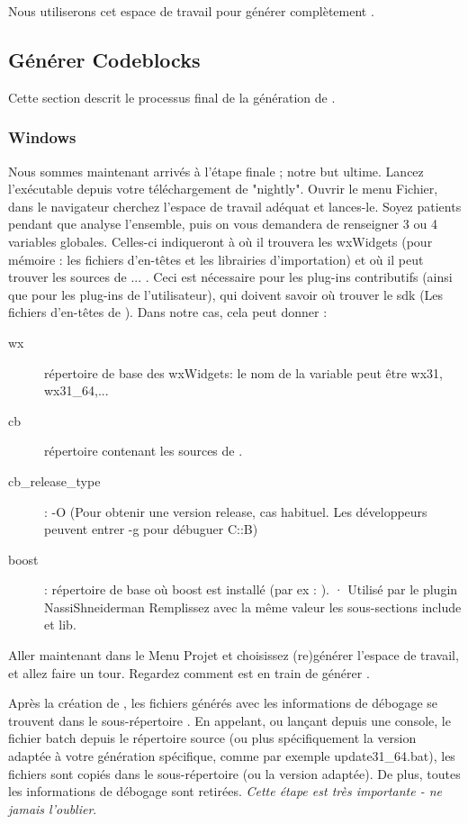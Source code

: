 Nous utiliserons cet espace de travail pour générer complètement \codeblocks.


\subsection{Générer Codeblocks}

Cette section descrit le processus final de la génération de \codeblocks.

\subsubsection{Windows}

Nous sommes maintenant arrivés à l'étape finale ; notre but ultime. Lancez l'exécutable \codeblocks depuis votre téléchargement de "nightly". Ouvrir le menu Fichier, dans le navigateur cherchez l'espace de travail adéquat et lances-le. Soyez patients pendant que \codeblocks analyse l'ensemble, puis on vous demandera de renseigner 3 ou 4 variables globales. Celles-ci indiqueront à \codeblocks où il trouvera les wxWidgets (pour mémoire : les fichiers d'en-têtes et les librairies d'importation) et où il peut trouver les sources de ... \codeblocks. Ceci est nécessaire pour les plug-ins contributifs (ainsi que pour les plug-ins de l'utilisateur), qui doivent savoir où trouver le sdk (Les fichiers d'en-têtes de \codeblocks). Dans notre cas, cela peut donner :
\begin{description}
\item[wx]  répertoire de base des wxWidgets: le nom de la variable peut être wx31, wx31\_64,...
\item[cb]  répertoire contenant les sources de \codeblocks.
\item[cb\_release\_type] : -O (Pour obtenir une version release, cas habituel.
         Les développeurs peuvent entrer -g pour débuguer C::B)
\item[boost] : répertoire de base où boost est installé (par ex : ).
·         Utilisé par le plugin NassiShneiderman
          Remplissez avec la même valeur les sous-sections include et lib.
\end{description}

Aller maintenant dans le Menu Projet et choisissez (re)générer l'espace de travail, et allez faire un tour. Regardez comment \codeblocks est en train de générer \codeblocks.

Après la création de \codeblocks, les fichiers générés avec les informations de débogage se trouvent dans le sous-répertoire . En appelant, ou lançant depuis une console, le fichier batch  depuis le répertoire source  (ou plus spécifiquement la version adaptée à votre génération spécifique, comme par exemple update31\_64.bat), les fichiers sont copiés dans le sous-répertoire  (ou la version adaptée). De plus, toutes les informations de débogage sont retirées. \textit{Cette étape est très importante - ne jamais l'oublier}.

